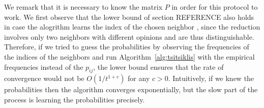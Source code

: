 We remark that it is necessary to know the matrix $P$ in order for this 
protocol to work. We first observe that the lower bound of section REFERENCE
also holds in case the alogrithm learns the index of the chosen neighbor
, since the reduction involves only two neighbors with different opinions and
are thus distinguishable. 
Therefore, if we tried to guess the probabilities by observing 
the frequencies of the indices of the neighbors and run Algorithm~\ref{alg:tsitsiklis}
with the empirical frequencies instead of the $p_{ij}$, the lower bound
ensures that the rate of convergence would not be $O(1/t^{1+c})$ for any $c>0$.  
Intuitively, if we knew the probabilities then the algorithm converges exponentially,
but the slow part of the process is learning the probabilities 
precisely.
